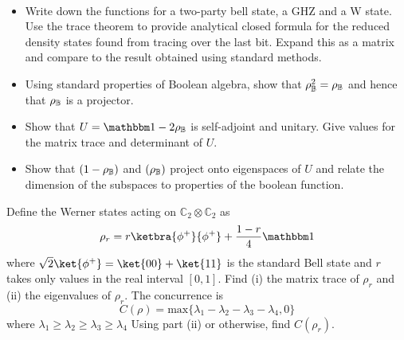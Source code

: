 \begin{myexercise}
~
\begin{itemize}
 \item[(i)] Write down the functions for a two-party bell state, a GHZ and a W state.  Use the trace theorem to provide analytical closed formula for the reduced density states found 
 from tracing over the last bit.  Expand this as a matrix and compare to the result obtained using standard methods.  
 \item[(ii)] Using standard properties of Boolean algebra, show that $\rho_{{\mathbb B}}^2 = \rho_{{\mathbb B}}$ and hence that $\rho_{{\mathbb B}}$ is a projector.
 \item[(iii)] Show that $U=\I -2\rho_{\7 B}$ is self-adjoint and unitary.  Give values for the matrix trace and determinant of $U$. 
 \item[(iv)] Show that $(1-\rho_{{\mathbb B}})$ and $(\rho_{{\mathbb B}})$ project onto eigenspaces of $U$ and relate the dimension of the subspaces to properties of the boolean function.   
\end{itemize}
\end{myexercise}







\begin{myexercise}
Define the Werner states acting on $\mathbb{C}_2\otimes \mathbb{C}_2$ as 
\begin{equation}
    \rho_r = r\ketbra{\phi^+}{\phi^+}+ \frac{1-r}{4}\I
\end{equation}
where $\sqrt{2}\ket{\phi^+}=\ket{00}+\ket{11}$ is the standard Bell state and $r$ takes only values in the real interval $[0,1]$. Find (i) the matrix trace of $\rho_r$ and (ii) the eigenvalues of $\rho_r$.  The concurrence is 
\begin{equation}
    C(\rho) = \text{max}\{\lambda_1 - \lambda_2 - \lambda_3 - \lambda_4, 0\}
\end{equation}
where $\lambda_1 \geq \lambda_2 \geq \lambda_3 \geq \lambda_4$
Using part (ii) or otherwise, find $C(\rho_r)$. 
\end{myexercise}



